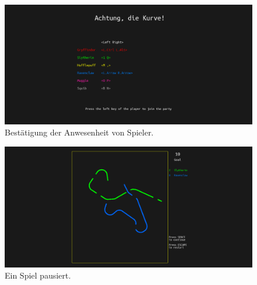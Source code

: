 \documentclass[doktyp=studarbeit]{TUBAFarbeiten}
\begin{document}
\begin{figure}[!htb]
	\centering
	\includegraphics[width=0.9\linewidth]{2.png}
	\caption{Bestätigung der Anwesenheit von Spieler.}
	\label{fig:confirmation}
\end{figure}

\begin{figure}[!htb]
	\centering
	\includegraphics[width=0.9\linewidth]{3.png}
	\caption{Ein Spiel pausiert.}
	\label{fig:pause}
\end{figure}
\end{document}
